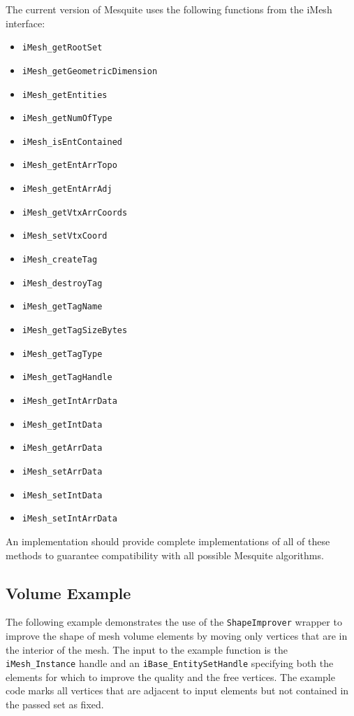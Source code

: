 The current version of Mesquite uses the following functions from the iMesh interface:
\begin{itemize}
\item \texttt{iMesh\_getRootSet}
\item \texttt{iMesh\_getGeometricDimension}
\item \texttt{iMesh\_getEntities}
\item \texttt{iMesh\_getNumOfType}
\item \texttt{iMesh\_isEntContained}
\item \texttt{iMesh\_getEntArrTopo}
\item \texttt{iMesh\_getEntArrAdj}
\item \texttt{iMesh\_getVtxArrCoords}
\item \texttt{iMesh\_setVtxCoord}
\item \texttt{iMesh\_createTag}
\item \texttt{iMesh\_destroyTag}
\item \texttt{iMesh\_getTagName}
\item \texttt{iMesh\_getTagSizeBytes}
\item \texttt{iMesh\_getTagType}
\item \texttt{iMesh\_getTagHandle}
\item \texttt{iMesh\_getIntArrData}
\item \texttt{iMesh\_getIntData}
\item \texttt{iMesh\_getArrData}
\item \texttt{iMesh\_setArrData}
\item \texttt{iMesh\_setIntData}
\item \texttt{iMesh\_setIntArrData}
\end{itemize}

An implementation should provide complete implementations of all of these methods to guarantee compatibility with all possible Mesquite algorithms. 

\subsection{Volume Example}

The following example demonstrates the use of the \texttt{ShapeImprover} wrapper to improve the shape of mesh volume elements by moving only vertices that are in the interior of the mesh.  The input to the example function is the \texttt{iMesh\_Instance} handle and an \texttt{iBase\_EntitySetHandle} specifying both the elements for which to improve the quality and the free vertices.  The example code marks all vertices that are adjacent to input elements but not contained in the passed set as fixed.

